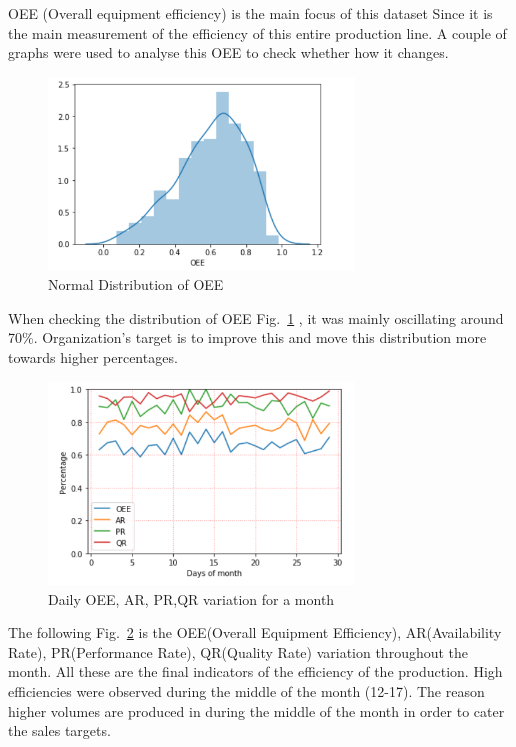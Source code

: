 OEE (Overall equipment efficiency) is the main focus of this dataset Since it is the main measurement of the efficiency of this entire production line. A couple of graphs were used to analyse this OEE to check whether how it changes. 

\begin{figure}[ht]
  \begin{center}
  \includegraphics[width=3.2in]{photo/dist_oee.png}
  \caption{Normal Distribution of OEE}\label{distributionOEE}
  \end{center}
\end{figure}

When checking the distribution of OEE Fig.~\ref{distributionOEE} , it was mainly oscillating around 70\%. Organization's target is to improve this and move this distribution more towards higher percentages. 

\begin{figure}[ht]
  \begin{center}
  \includegraphics[width=3.2in]{photo/oee_during_month.png}
  \caption{Daily OEE, AR, PR,QR  variation for a month}\label{OEEMonth}
  \end{center}
\end{figure}

The following Fig.~\ref{OEEMonth} is the OEE(Overall Equipment Efficiency), AR(Availability Rate), PR(Performance Rate), QR(Quality Rate) variation throughout the month.  All these are the final indicators of the efficiency of the production. High efficiencies were observed during the middle of the month (12-17). The reason higher volumes are produced in during the middle of the month in order to cater the sales targets.


